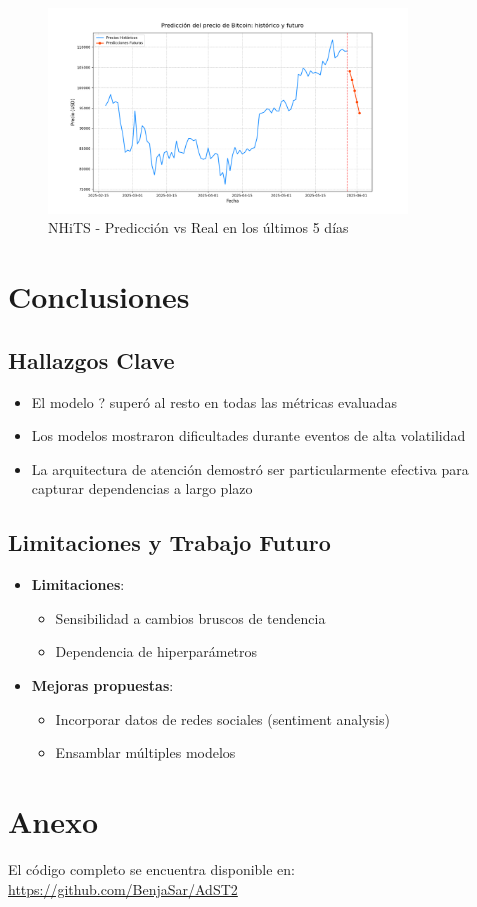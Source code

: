 \documentclass[12pt]{article}
\begin{document}
\begin{figure}[H]
\centering
\includegraphics[width=0.85\textwidth]{../results/grafico_predicciones_futuras.png} %
\caption{NHiTS - Predicción vs Real en los últimos 5 días}
\end{figure}


\newpage
\section{Conclusiones}
\label{sec:conclusiones}

\subsection{Hallazgos Clave}

\begin{itemize}
\item El modelo ? superó al resto en todas las métricas evaluadas %
\item Los modelos mostraron dificultades durante eventos de alta volatilidad
\item La arquitectura de atención demostró ser particularmente efectiva para capturar dependencias a largo plazo
\end{itemize}

\subsection{Limitaciones y Trabajo Futuro}

\begin{itemize}
\item \textbf{Limitaciones}:
\begin{itemize}
\item Sensibilidad a cambios bruscos de tendencia
\item Dependencia de hiperparámetros
\end{itemize}

\item \textbf{Mejoras propuestas}:
\begin{itemize}
\item Incorporar datos de redes sociales (sentiment analysis)
\item Ensamblar múltiples modelos
\end{itemize}
\end{itemize}


\newpage
\section*{Anexo}
El código completo se encuentra disponible en: \\
\url{https://github.com/BenjaSar/AdST2}
\end{document}
